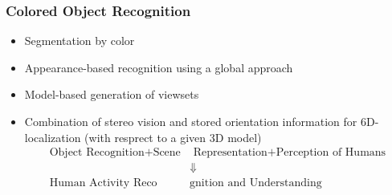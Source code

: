 \subsubsection{Colored Object Recognition}
\begin{itemize}
	\item Segmentation by color
	\item Appearance-based recognition using a global approach
	\item Model-based generation of viewsets
	\item Combination of stereo vision and stored orientation information for 6D-localization (with resprect to a given 3D model)
\begin{align*}
	\text{Object Recognition} + \text{Scene} & \text{ Representation} + \text{Perception of Humans} \\
	& \Downarrow \\ \text{Human Activity Reco} & \text{gnition and Understanding}
\end{align*}
\end{itemize}
